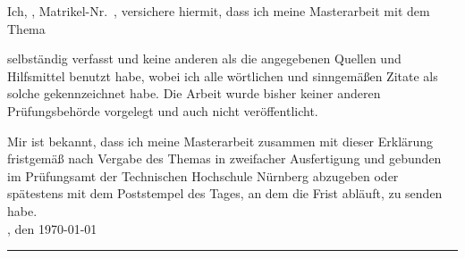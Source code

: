 Ich, \autor, Matrikel-Nr.\ \matrikelnr, versichere hiermit, dass ich meine Masterarbeit mit dem Thema
\begin{quote}
\textit{\titel}
\end{quote}
selbständig verfasst und keine anderen als die angegebenen Quellen und Hilfsmittel benutzt habe, wobei ich alle wörtlichen und sinngemäßen Zitate als solche gekennzeichnet habe. Die Arbeit wurde bisher keiner anderen Prüfungsbehörde vorgelegt und auch nicht veröffentlicht.

Mir ist bekannt, dass ich meine Masterarbeit zusammen mit dieser Erklärung fristgemäß nach Vergabe des Themas in zweifacher Ausfertigung und gebunden im Prüfungsamt der Technischen Hochschule Nürnberg abzugeben oder spätestens mit dem Poststempel des Tages, an dem die Frist abläuft, zu senden habe.\\[6ex]

\ort, den \today


\rule[-0.2cm]{5cm}{0.5pt}

\textsc{\autor} 
